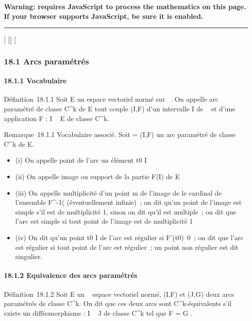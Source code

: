 \textbf{Warning: 
requires JavaScript to process the mathematics on this page.\\ If your
browser supports JavaScript, be sure it is enabled.}

\begin{center}\rule{3in}{0.4pt}\end{center}

{[}
{[}{]}
{[}

\subsubsection{18.1 Arcs paramétrés}

\paragraph{18.1.1 Vocabulaire}

Définition~18.1.1 Soit E un espace vectoriel normé sur ~. On appelle arc
paramétré de classe C^k de E tout couple (I,F) d'un
intervalle I de ~ et d'une application F : I \rightarrow~ E de classe
C^k.

Remarque~18.1.1 Vocabulaire associé. Soit \Gamma = (I,F) un arc paramétré de
classe C^k de E.

\begin{itemize}
\itemsep1pt\parskip0pt
\item
  (i) On appelle point de l'arc \Gamma un élément t0 \in I
\item
  (ii) On appelle image ou support de \Gamma la partie F(I) de E
\item
  (iii) On appelle multiplicité d'un point m de l'image de \Gamma le cardinal
  de l'ensemble F^-1(\m\)
  (éventuellement infinie)~; on dit qu'un point de l'image est simple
  s'il est de multiplicité 1, sinon on dit qu'il est multiple~; on dit
  que l'arc est simple si tout point de l'image est de multiplicité 1
\item
  (iv) On dit qu'un point t0 \in I de l'arc \Gamma est régulier si
  F'(t0)\neq~0~; on dit que l'arc est
  régulier si tout point de l'arc est régulier~; un point non régulier
  est dit singulier.
\end{itemize}

\paragraph{18.1.2 Equivalence des arcs paramétrés}

Définition~18.1.2 Soit E un ~ espace vectoriel normé, (I,F) et (J,G)
deux arcs paramétrés de classe C^k. On dit que ces deux arcs
sont C^k-équivalents s'il existe un difféomorphisme \theta : I \rightarrow~ J
de classe C^k tel que F = G \cdot \theta.

